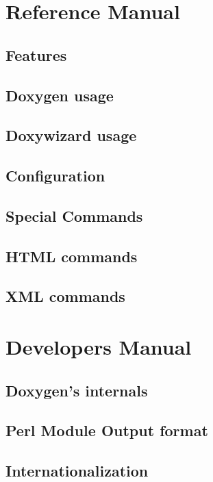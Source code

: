 \documentclass{book}
\begin{document}
\part{Reference Manual}
\chapter{Features}\label{features}\hypertarget{features}{}
\chapter{Doxygen usage}\label{doxygen_usage}\hypertarget{doxygen_usage}{}
\chapter{Doxywizard usage}\label{doxywizard_usage}\hypertarget{doxywizard_usage}{}
\chapter{Configuration}\label{config}\hypertarget{config}{}
\chapter{Special Commands}\label{commands}\hypertarget{commands}{}
\chapter{HTML commands}\label{htmlcmds}\hypertarget{htmlcmds}{}
\chapter{XML commands}\label{xmlcmds}\hypertarget{xmlcmds}{}
\part{Developers Manual}
\chapter{Doxygen's internals}\label{arch}\hypertarget{arch}{}
\chapter{Perl Module Output format}\label{perlmod}\hypertarget{perlmod}{}
\chapter{Internationalization}\label{langhowto}\hypertarget{langhowto}{}
\printindex
\end{document}
